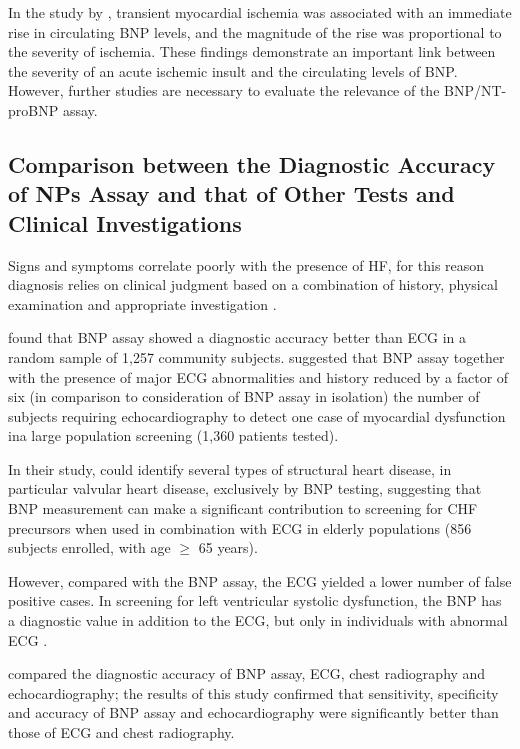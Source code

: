 \documentclass[14pt,a4paper,onecolumn]{extarticle}
\begin{document}
In the study by \citep{bib3164}, transient myocardial ischemia was associated with an immediate rise in circulating BNP levels, and the magnitude of the rise was proportional to the severity of ischemia. These findings demonstrate an important link between the severity of an acute ischemic insult and the circulating levels of BNP. However, further studies are necessary to evaluate the relevance of the BNP/NT-proBNP assay.

\subsection{ Comparison between the Diagnostic Accuracy of NPs Assay and that of Other Tests and Clinical Investigations}

Signs and symptoms correlate poorly with the presence of HF, for this reason diagnosis relies on clinical judgment based on a combination of history, physical examination and appropriate investigation \citep{bib365} \citep{bib369} \citep{bib370} \citep{bib3168}.


\citep{bib392} found that BNP assay showed a diagnostic accuracy better than ECG in a random sample of 1,257 community subjects.  \citep{bib3171} suggested that BNP assay together with the presence of major ECG abnormalities and history reduced by a factor of six (in comparison to consideration of BNP assay in isolation) the number of subjects requiring echocardiography to detect one case of myocardial dysfunction ina large population screening (1,360 patients tested).

In their study, \citep{bib3174} could identify several types of structural heart disease, in particular valvular heart disease, exclusively by BNP testing, suggesting that BNP measurement can make a significant contribution to screening for CHF precursors when used in combination with ECG in elderly populations (856 subjects enrolled, with age $\geq$ 65 years).

However, compared with the BNP assay, the ECG yielded a lower number of false positive cases. In screening for left ventricular systolic dysfunction, the BNP has a diagnostic value in addition to the ECG, but only in individuals with abnormal ECG \citep{bib3172}.

\citep{bib3170} compared the diagnostic accuracy of BNP assay, ECG, chest radiography and echocardiography; the results of this study confirmed that sensitivity, specificity and accuracy of BNP assay and echocardiography were significantly better than those of ECG and chest radiography.
\end{document}
